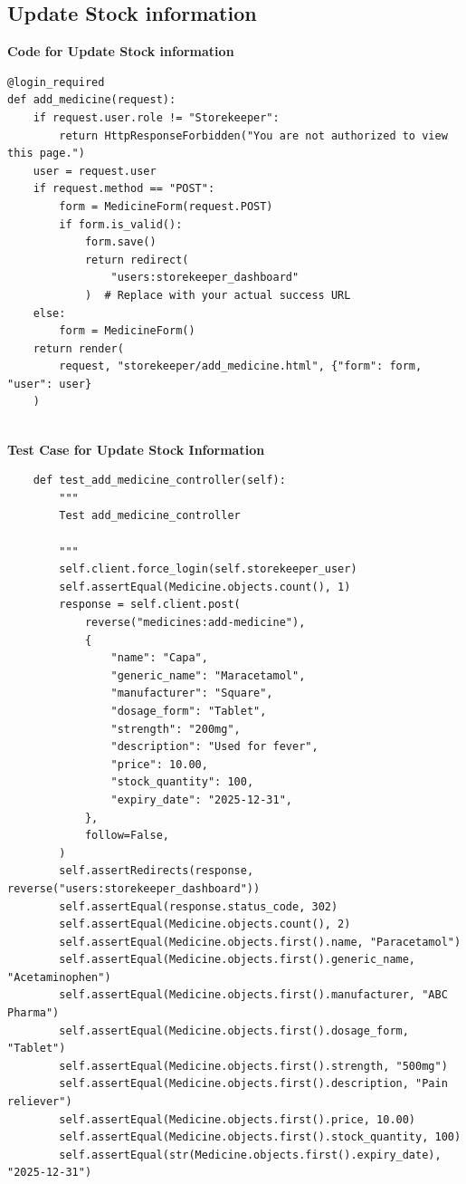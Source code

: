 \documentclass[a4paper,12pt]{article}
\begin{document}
\subsection{Update Stock information}
\textbf{Code for Update Stock information}
\lstset{style=pythonSolarized}
\begin{lstlisting}
@login_required
def add_medicine(request):
    if request.user.role != "Storekeeper":
        return HttpResponseForbidden("You are not authorized to view this page.")
    user = request.user
    if request.method == "POST":
        form = MedicineForm(request.POST)
        if form.is_valid():
            form.save()
            return redirect(
                "users:storekeeper_dashboard"
            )  # Replace with your actual success URL
    else:
        form = MedicineForm()
    return render(
        request, "storekeeper/add_medicine.html", {"form": form, "user": user}
    )


\end{lstlisting}
\textbf{Test Case for Update Stock Information}
\lstset{style=pythonSolarized}
\begin{lstlisting}
    def test_add_medicine_controller(self):
        """
        Test add_medicine_controller

        """
        self.client.force_login(self.storekeeper_user)
        self.assertEqual(Medicine.objects.count(), 1)
        response = self.client.post(
            reverse("medicines:add-medicine"),
            {
                "name": "Capa",
                "generic_name": "Maracetamol",
                "manufacturer": "Square",
                "dosage_form": "Tablet",
                "strength": "200mg",
                "description": "Used for fever",
                "price": 10.00,
                "stock_quantity": 100,
                "expiry_date": "2025-12-31",
            },
            follow=False,
        )
        self.assertRedirects(response, reverse("users:storekeeper_dashboard"))
        self.assertEqual(response.status_code, 302)
        self.assertEqual(Medicine.objects.count(), 2)
        self.assertEqual(Medicine.objects.first().name, "Paracetamol")
        self.assertEqual(Medicine.objects.first().generic_name, "Acetaminophen")
        self.assertEqual(Medicine.objects.first().manufacturer, "ABC Pharma")
        self.assertEqual(Medicine.objects.first().dosage_form, "Tablet")
        self.assertEqual(Medicine.objects.first().strength, "500mg")
        self.assertEqual(Medicine.objects.first().description, "Pain reliever")
        self.assertEqual(Medicine.objects.first().price, 10.00)
        self.assertEqual(Medicine.objects.first().stock_quantity, 100)
        self.assertEqual(str(Medicine.objects.first().expiry_date), "2025-12-31")


\end{lstlisting}
\end{document}
